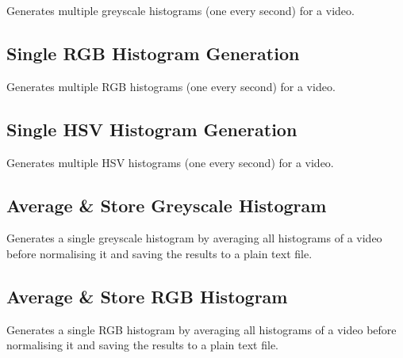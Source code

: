 Generates multiple greyscale histograms (one every second) for a video.




\subsection{Single RGB Histogram Generation}
\label{sec:code-single_rgb_histogram_generation}

Generates multiple RGB histograms (one every second) for a video.




\subsection{Single HSV Histogram Generation}
\label{sec:code-single_hsv_histogram_generation}

Generates multiple HSV histograms (one every second) for a video.




\subsection{Average \& Store Greyscale Histogram}
\label{sec:code-generate_and_store_average_grey_histogram}

Generates a single greyscale histogram by averaging all histograms of a video before normalising it and saving the results to a plain text file.




\subsection{Average \& Store RGB Histogram}
\label{sec:code-generate_and_store_average_rgb_histogram}

Generates a single RGB histogram by averaging all histograms of a video before normalising it and saving the results to a plain text file.

